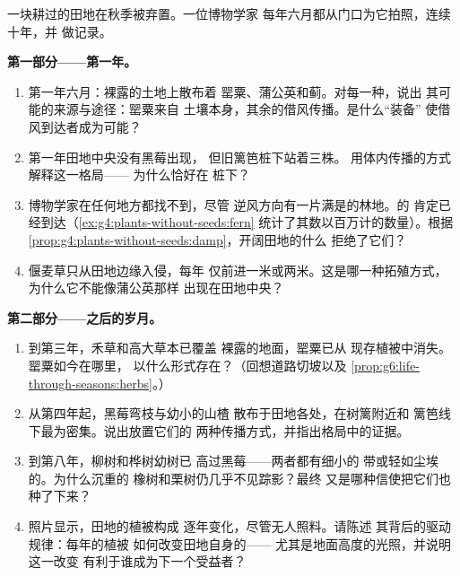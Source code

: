 \begin{problem}\label{pb:g6:how-plants-spread:1}
一块耕过的田地在秋季被弃置。一位博物学家
每年六月都从门口为它拍照，连续十年，并
做记录。

\medskip\noindent\textbf{第一部分——第一年。}
\begin{enumerate}
  \item 第一年六月：裸露的土地上散布着
        罂粟、蒲公英和蓟。对每一种，说出
        其可能的来源与途径：罂粟来自
        土壤本身，其余的借风传播。是什么“装备”
        使借风到达者成为可能？
  \item 第一年田地中央没有黑莓出现，
        但旧篱笆桩下站着三株。
        用体内传播的方式解释这一格局——
        为什么恰好在
        桩下？
  \item 博物学家在任何地方都找不到，尽管
        逆风方向有一片满是的林地。的
        肯定已经到达（\cref{ex:g4:plants-without-seeds:fern}
        统计了其数以百万计的数量）。根据
        \cref{prop:g4:plants-without-seeds:damp}，开阔田地的什么
        拒绝了它们？
  \item 偃麦草只从田地边缘入侵，每年
        仅前进一米或两米。这是哪一种拓殖方式，
        为什么它不能像蒲公英那样
        出现在田地中央？
\end{enumerate}

\medskip\noindent\textbf{第二部分——之后的岁月。}
\begin{enumerate}[resume]
  \item 到第三年，禾草和高大草本已覆盖
        裸露的地面，罂粟已从
        现存植被中消失。罂粟如今在哪里，
        以什么形式存在？（回想道路切坡以及
        \cref{prop:g6:life-through-seasons:herbs}。）
  \item 从第四年起，黑莓弯枝与幼小的山楂
        散布于田地各处，在树篱附近和
        篱笆线下最为密集。说出放置它们的
        两种传播方式，并指出格局中的证据。
  \item 到第八年，柳树和桦树幼树已
        高过黑莓——两者都有细小的
        带或轻如尘埃的。为什么沉重的
        橡树和栗树仍几乎不见踪影？最终
        又是哪种信使把它们也种了下来？
  \item 照片显示，田地的植被构成
        逐年变化，尽管无人照料。请陈述
        其背后的驱动规律：每年的植被
        如何改变田地自身的——
        尤其是地面高度的光照，并说明这一改变
        有利于谁成为下一个受益者？
\end{enumerate}


\end{problem}
